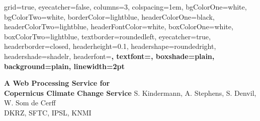 \documentclass[portrait,a0paper]{baposter}
\begin{document}


\begin{poster}%
  {
  grid=true,
  eyecatcher=false,
  columns=3,
  colspacing=1em,
  bgColorOne=white,
  bgColorTwo=white,
  borderColor=lightblue,
  headerColorOne=black,
  headerColorTwo=lightblue,
  headerFontColor=white,
  boxColorOne=white,
  boxColorTwo=lightblue,
  textborder=roundedleft,
  eyecatcher=true,
  headerborder=closed,
  headerheight=0.1\textheight,
  headershape=roundedright,
  headershade=shadelr,
  headerfont=\Large\bf\textsc, %
  textfont={\setlength{\parindent}{1.5em}},
  boxshade=plain,
  background=plain,
  linewidth=2pt
  }
  {

  }
  {\sf\bf
          A Web Processing Service for\\ Copernicus Climate Change Service
  }
  {
    \vspace{1em} S. Kindermann, A. Stephens, S. Denvil, W. Som de Cerff\\
    {\smaller DKRZ, SFTC, IPSL, KNMI}
  }
  {

  }



\end{poster}
\end{document}
